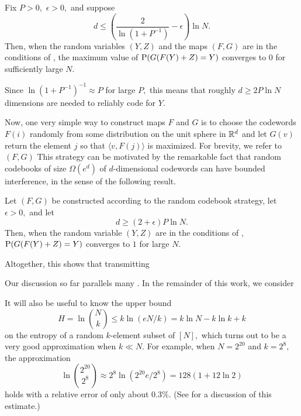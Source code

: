 \begin{corollary} \label{prop:information-simple}
    Fix $P > 0,$ $\epsilon > 0,$ and suppose
    $$
    d \le \left(\frac 2 {\ln(1 + P^{-1})} - \epsilon\right) \ln N.
    $$
    Then, when the random variables $(Y, Z)$ and the maps $(F, G)$ are in the conditions of , the maximum value of $\operatorname{P}(G(F(Y) + Z) = Y)$ converges to $0$ for sufficiently large $N.$
\end{corollary}

Since $\ln(1 + P^{-1})^{-1} \approx P$ for large $P,$ this means that roughly $d \ge 2 P \ln N$ dimensions are needed to reliably code for $Y.$

Now, one very simple way to construct maps $F$ and $G$ is to choose the codewords $F(i)$ randomly from some distribution on the unit sphere in $\mathbb{R}^d$ and let $G(v)$ return the element $j$ so that $\langle v, F(j) \rangle$ is maximized. For brevity, we refer to $(F, G)$ This strategy can be motivated by the remarkable fact that random codebooks of size $\Omega(e^d)$ of $d$-dimensional codewords can have bounded interference, in the sense of the following result.

\begin{proposition} \label{prop:random-information}
    Let $(F, G)$ be constructed according to the random codebook strategy, let $\epsilon > 0,$ and let
    $$
    d \ge (2 + \epsilon) P \ln N.
    $$
    Then, when the random variable $(Y, Z)$ are in the conditions of , $\operatorname{P}(G(F(Y) + Z) = Y)$ converges to $1$ for large $N.$
\end{proposition}

Altogether, this shows that transmitting


Our discussion so far parallels many \cite{cover_elements_2006}. In the remainder of this work, we consider

It will also be useful to know the upper bound
$$
	H = \ln \binom N k \le k \ln (eN/k) = k \ln N - k \ln k + k
$$
on the entropy of a random $k$-element subset of $[N],$ which turns out to be a very good approximation when $k \ll N.$ For example, when $N = 2^{20}$ and $k = 2^8,$ the approximation
$$
	\ln \binom{2^{20}}{2^8} \approx 2^8 \ln(2^{20} e/2^8) = 128 (1 + 12 \ln 2)
$$
holds with a relative error of only about $0.3 \%.$ (See  for a discussion of this estimate.)

